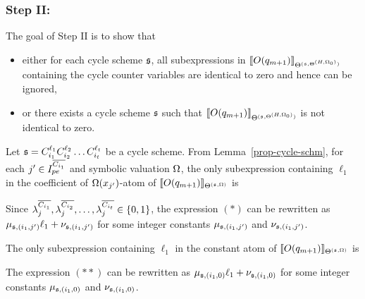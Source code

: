 \subsubsection{Step II:}
The goal of Step II is to show that 
\begin{itemize}
\item either for each cycle scheme ${\mathfrak{s} }$, all subexpressions in $\llbracket O(q_{m+1})\rrbracket_{\Theta^{({\mathfrak{s} },\Theta^{(H,\Omega_0)})}}$ containing the cycle counter variables are identical to zero and hence can be ignored, 
\item or  there exists a cycle scheme ${\mathfrak{s} }$ such that $\llbracket O(q_{m+1})\rrbracket_{\Theta^{({\mathfrak{s} },\Theta^{(H,\Omega_0)})}}$ is not identical to zero. 
\end{itemize}
Let ${\mathfrak{s} }=C_{i_1}^{\ell_1} C_{i_2}^{\ell_2} \dots C_{i_t}^{\ell_t}$ be a cycle scheme. From Lemma~\ref{prop-cycle-schm}, for each $j'\in I^{\overline{C_{i_1}}}_{pe}$ and symbolic valuation $\Omega$, the only subexpression containing $\ell_1$ in the coefficient of $\Omega(x_{j'})$-atom of $\llbracket O(q_{m+1})\rrbracket_{\Theta^{({\mathfrak{s} },\Omega)}}$ is
\begin{center}
\end{center}
Since $\lambda^{\overline{C_{i_1}}}_{j}, \lambda^{\overline{C_{i_2}}}_{j}, \dots, \lambda^{\overline{C_{i_t}}}_{j} \in \{0, 1\}$, the expression $(\ast)$  can be rewritten as  
 $\mu_{{\mathfrak{s} }, (i_1,j')} \ell_1 + \nu_{{\mathfrak{s} }, (i_1,j')}$ for some integer constants $\mu_{{\mathfrak{s} }, (i_1,j')}$ and $\nu_{{\mathfrak{s} }, (i_1,j')}$. 
 
The only subexpression containing $\ell_1$ in the constant atom of  $\llbracket O(q_{m+1})\rrbracket_{\Theta^{({\mathfrak{s} },\Omega)}}$ is
\begin{center}
\end{center}
%
The expression $(\ast\ast)$ can be rewritten as $\mu_{{\mathfrak{s} },(i_1,0)} \ell_1 + \nu_{{\mathfrak{s} },(i_1,0)}$ for some integer constants $\mu_{{\mathfrak{s} }, (i_1,0)}$ and $\nu_{{\mathfrak{s} }, (i_1,0)}$. 

